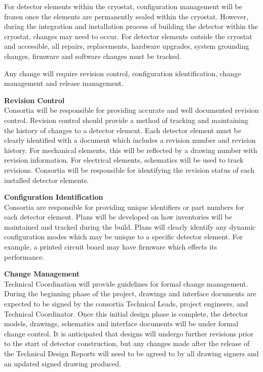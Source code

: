 For detector elements within the cryostat, configuration management
will be frozen once the elements are permanently sealed within the
cryostat.  However, during the integration and installation process of
building the detector within the cryostat, changes may need to occur.
For detector elements outside the cryostat and accessible, all
repairs, replacements, hardware upgrades, system grounding changes,
firmware and software changes must be tracked.

Any change will require revision control, configuration
identification, change management and release management.

{\bf Revision Control}\\
Consortia will be responsible for providing accurate and well
documented revision control.  Revision control should provide a method
of tracking and maintaining the history of changes to a detector
element.  Each detector element must be clearly identified with a
document which includes a revision number and revision history.  For
mechanical elements, this will be reflected by a drawing number with
revision information.  For electrical elements, schematics will be used
to track revisions.  Consortia will be responsible for identifying the
revision status of each installed detector elements.

{\bf Configuration Identification}\\
Consortia are responsible for providing unique identifiers or part
numbers for each detector element.  Plans will be developed on how
inventories will be maintained and tracked during the build.  Plans
will clearly identify any dynamic configuration modes which may be
unique to a specific detector element.  For example, a printed circuit
board may have firmware which effects its performance.

{\bf Change Management}\\
Technical Coordination will provide guidelines
for formal change management.  During the beginning phase of the
project, drawings and interface documents are expected to be signed by
the consortia Technical Leads, project engineers, and Technical
Coordinator.  Once this initial design phase is complete, the detector
models, drawings, schematics and interface documents will be under
formal change control.  It is anticipated that designs will undergo
further revisions prior to the start of detector construction, but any
changes made after the release of the Technical Design Reports will
need to be agreed to by all drawing signers and an updated signed
drawing produced.

